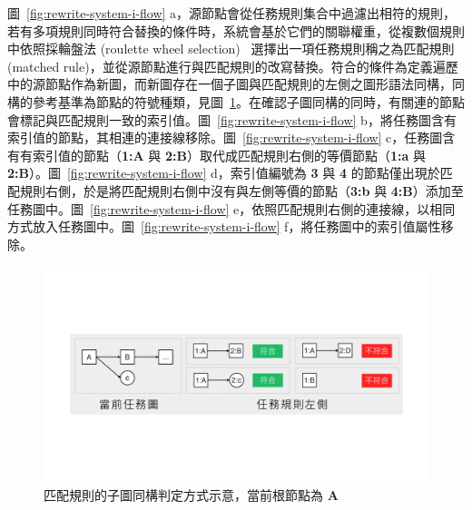 圖~\ref{fig:rewrite-system-i-flow} a，源節點會從任務規則集合中過濾出相符的規則，若有多項規則同時符合替換的條件時，系統會基於它們的關聯權重，從複數個規則中依照採輪盤法 (roulette wheel selection)~\cite{lipowski2012roulette} 選擇出一項任務規則稱之為匹配規則 (matched rule)，並從源節點進行與匹配規則的改寫替換。符合的條件為定義遍歷中的源節點作為新圖，而新圖存在一個子圖與匹配規則的左側之圖形語法同構，同構的參考基準為節點的符號種類，見圖~\ref{fig:rewrite-system-isomorphic}。在確認子圖同構的同時，有關連的節點會標記與匹配規則一致的索引值。圖~\ref{fig:rewrite-system-i-flow} b，將任務圖含有索引值的節點，其相連的連接線移除。圖~\ref{fig:rewrite-system-i-flow} c，任務圖含有有索引值的節點（\textbf{1:A} 與 \textbf{2:B}）取代成匹配規則右側的等價節點（\textbf{1:a} 與 \textbf{2:B}）。圖~\ref{fig:rewrite-system-i-flow} d，索引值編號為 \textbf{3} 與 \textbf{4} 的節點僅出現於匹配規則右側，於是將匹配規則右側中沒有與左側等價的節點（\textbf{3:b} 與 \textbf{4:B}）添加至任務圖中。圖~\ref{fig:rewrite-system-i-flow} e，依照匹配規則右側的連接線，以相同方式放入任務圖中。圖~\ref{fig:rewrite-system-i-flow} f，將任務圖中的索引值屬性移除。

\begin{figure}[!htb]
  \begin{center}
    \includegraphics[width=1.0\textwidth]{figures/rewrite-system-isomorphic.pdf}
    \caption{匹配規則的子圖同構判定方式示意，當前根節點為 \textbf{A}}
    \label{fig:rewrite-system-isomorphic}
  \end{center}
\end{figure}

